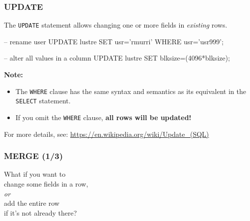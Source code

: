 \documentclass[english,serif,mathserif]{beamer}
\begin{document}
\begin{frame}[fragile]
  \frametitle{UPDATE}\small

  The \texttt{UPDATE} statement allows changing one or more fields in
  \emph{existing} rows.

  \begin{sql}
    -- rename user
    UPDATE lustre SET usr='rmurri' WHERE usr='usr999';

    -- alter all values in a column
    UPDATE lustre SET blksize=(4096*blksize);
  \end{sql}

  \+
  \textbf{Note:}
  \begin{itemize}
  \item The \texttt{WHERE} clause has the same syntax and semantics as its
    equivalent in the \texttt{SELECT} statement.
  \item If you omit the \texttt{WHERE} clause, \textbf{all rows will be updated!}
  \end{itemize}

  \+
  \begin{references}
    For more details, see:
    \url{https://en.wikipedia.org/wiki/Update_(SQL)}
  \end{references}
\end{frame}


\begin{frame}
  \frametitle{MERGE (1/3)}

  \begin{center} \Large
    What if you want to \\ change some fields in a row,
    \\
    \emph{or}
    \\
    add the entire row \\ if it's not already there?
  \end{center}
\end{frame}
\end{document}
